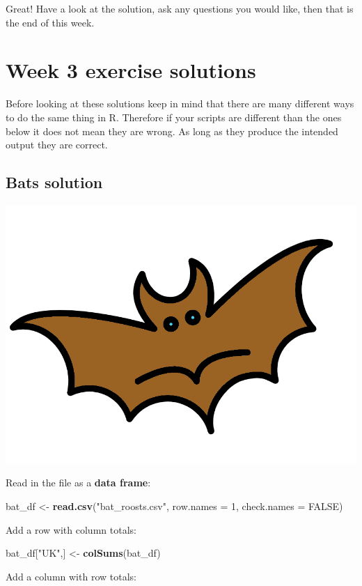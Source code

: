 \documentclass[]{book}
\newenvironment{Shaded}{\begin{snugshade}}{\end{snugshade}}
\newcommand{\KeywordTok}[1]{\textcolor[rgb]{0.13,0.29,0.53}{\textbf{#1}}}
\newcommand{\DataTypeTok}[1]{\textcolor[rgb]{0.13,0.29,0.53}{#1}}
\newcommand{\DecValTok}[1]{\textcolor[rgb]{0.00,0.00,0.81}{#1}}
\newcommand{\StringTok}[1]{\textcolor[rgb]{0.31,0.60,0.02}{#1}}
\newcommand{\OtherTok}[1]{\textcolor[rgb]{0.56,0.35,0.01}{#1}}
\newcommand{\OperatorTok}[1]{\textcolor[rgb]{0.81,0.36,0.00}{\textbf{#1}}}
\newcommand{\NormalTok}[1]{#1}
\begin{document}
Great! Have a look at the solution, ask any questions you would like,
then that is the end of this week.

\chapter{Week 3 exercise solutions}\label{week-3-exercise-solutions}

Before looking at these solutions keep in mind that there are many
different ways to do the same thing in R. Therefore if your scripts are
different than the ones below it does not mean they are wrong. As long
as they produce the intended output they are correct.

\section{Bats solution}\label{bats-solution}

\begin{center}\includegraphics[width=0.2\linewidth]{figures/bat} \end{center}

Read in the file as a \textbf{data frame}:

\begin{Shaded}
\begin{Highlighting}[]
\NormalTok{bat_df <-}\StringTok{ }\KeywordTok{read.csv}\NormalTok{(}\StringTok{"bat_roosts.csv"}\NormalTok{, }\DataTypeTok{row.names =} \DecValTok{1}\NormalTok{, }\DataTypeTok{check.names =} \OtherTok{FALSE}\NormalTok{)}
\end{Highlighting}
\end{Shaded}

Add a row with column totals:

\begin{Shaded}
\begin{Highlighting}[]
\NormalTok{bat_df[}\StringTok{"UK"}\NormalTok{,] <-}\StringTok{ }\KeywordTok{colSums}\NormalTok{(bat_df) }
\end{Highlighting}
\end{Shaded}

Add a column with row totals:

\begin{Shaded}
\end{Shaded}
\end{document}
